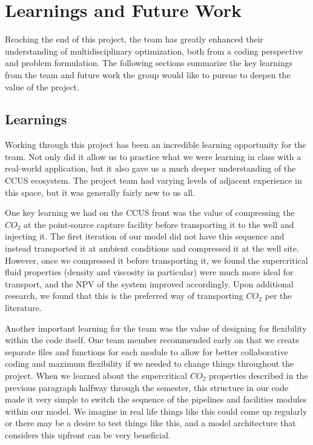 \documentclass[balance,upint,subscriptcorrection,varvw,mathalfa=cal=boondoxo,spanish,french,vietnamese,russian,greek,pdf-a,colorlinks]{asmeconf}
\begin{document}
\section{Learnings and Future Work}
Reaching the end of this project, the team has greatly enhanced their understanding of multidisciplinary optimization, both from a coding perspective and problem formulation. The following sections summarize the key learnings from the team and future work the group would like to pursue to deepen the value of the project.

\subsection{Learnings}
Working through this project has been an incredible learning opportunity for the team. Not only did it allow us to practice what we were learning in class with a real-world application, but it also gave us a much deeper understanding of the CCUS ecosystem. The project team had varying levels of adjacent experience in this space, but it was generally fairly new to us all.

One key learning we had on the CCUS front was the value of compressing the $CO_{2}$ at the point-source capture facility before transporting it to the well and injecting it. The first iteration of our model did not have this sequence and instead transported it at ambient conditions and compressed it at the well site. However, once we compressed it before transporting it, we found the supercritical fluid properties (density and viscosity in particular) were much more ideal for transport, and the NPV of the system improved accordingly. Upon additional research, we found that this is the preferred way of transporting $CO_{2}$ per the literature.

Another important learning for the team was the value of designing for flexibility within the code itself. One team member recommended early on that we create separate files and functions for each module to allow for better collaborative coding and maximum flexibility if we needed to change things throughout the project. When we learned about the supercritical $CO_{2}$ properties described in the previous paragraph halfway through the semester, this structure in our code made it very simple to switch the sequence of the pipelines and facilities modules within our model. We imagine in real life things like this could come up regularly or there may be a desire to test things like this, and a model architecture that considers this upfront can be very beneficial.
\end{document}

